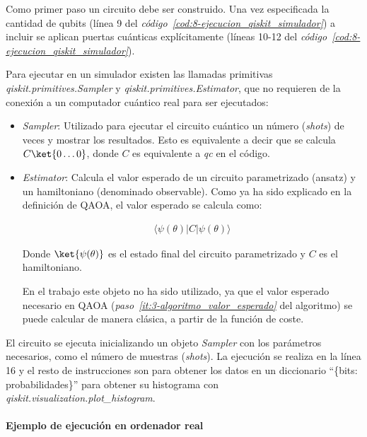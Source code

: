 Como primer paso un circuito debe ser construido.
Una vez especificada la cantidad de qubits (línea 9 del \textit{código~\ref{cod:8-ejecucion_qiskit_simulador}}) a incluir se aplican puertas cuánticas explícitamente (líneas 10{-}12 del \textit{código~\ref{cod:8-ejecucion_qiskit_simulador}}).

Para ejecutar en un simulador existen las llamadas primitivas \textit{qiskit.primitives.Sampler} y \textit{qiskit.primitives.Estimator}, que no requieren de la conexión a un computador cuántico real para ser ejecutados:
\begin{itemize}
\item \textit{Sampler}: Utilizado para ejecutar el circuito cuántico un número (\textit{shots}) de veces y mostrar los resultados.
  Esto es equivalente a decir que se calcula $C\ket{0 \ldots 0}$, donde $C$ es equivalente a \textit{qc} en el código.
  
\item \textit{Estimator}: Calcula el valor esperado de un circuito parametrizado (ansatz) y un hamiltoniano (denominado observable).
  Como ya ha sido explicado en la definición de QAOA, el valor esperado se calcula como:

  \begin{align}
    \langle \psi(\theta) \rvert C \lvert \psi(\theta) \rangle
  \end{align}

  Donde $\ket{\psi(\theta)}$ es el estado final del circuito parametrizado y $C$ es el hamiltoniano.

  En el trabajo este objeto no ha sido utilizado, ya que el valor esperado necesario en QAOA (\textit{paso~\ref{it:3-algoritmo_valor_esperado}} del algoritmo) se puede calcular de manera clásica, a partir de la función de coste.
\end{itemize}

El circuito se ejecuta inicializando un objeto \textit{Sampler} con los parámetros necesarios, como el número de muestras (\textit{shots}).
La ejecución se realiza en la línea 16 y el resto de instrucciones son para obtener los datos en un diccionario ``\{bits: probabilidades\}'' para obtener su histograma con \textit{qiskit.visualization.plot\_histogram}.


\paragraph{Ejemplo de ejecución en ordenador real}

